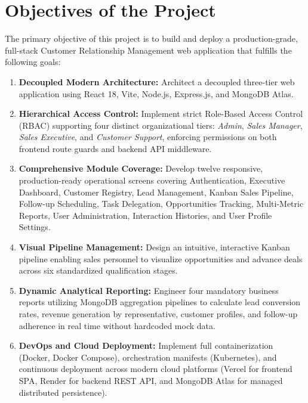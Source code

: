 \section{Objectives of the Project}
The primary objective of this project is to build and deploy a production-grade, full-stack Customer Relationship Management web application that fulfills the following goals:
\begin{enumerate}[label=\textbf{OBJ-\arabic*}:]
    \item \textbf{Decoupled Modern Architecture:} Architect a decoupled three-tier web application using React 18, Vite, Node.js, Express.js, and MongoDB Atlas.
    \item \textbf{Hierarchical Access Control:} Implement strict Role-Based Access Control (RBAC) supporting four distinct organizational tiers: \textit{Admin}, \textit{Sales Manager}, \textit{Sales Executive}, and \textit{Customer Support}, enforcing permissions on both frontend route guards and backend API middleware.
    \item \textbf{Comprehensive Module Coverage:} Develop twelve responsive, production-ready operational screens covering Authentication, Executive Dashboard, Customer Registry, Lead Management, Kanban Sales Pipeline, Follow-up Scheduling, Task Delegation, Opportunities Tracking, Multi-Metric Reports, User Administration, Interaction Histories, and User Profile Settings.
    \item \textbf{Visual Pipeline Management:} Design an intuitive, interactive Kanban pipeline enabling sales personnel to visualize opportunities and advance deals across six standardized qualification stages.
    \item \textbf{Dynamic Analytical Reporting:} Engineer four mandatory business reports utilizing MongoDB aggregation pipelines to calculate lead conversion rates, revenue generation by representative, customer profiles, and follow-up adherence in real time without hardcoded mock data.
    \item \textbf{DevOps and Cloud Deployment:} Implement full containerization (Docker, Docker Compose), orchestration manifests (Kubernetes), and continuous deployment across modern cloud platforms (Vercel for frontend SPA, Render for backend REST API, and MongoDB Atlas for managed distributed persistence).
\end{enumerate}


